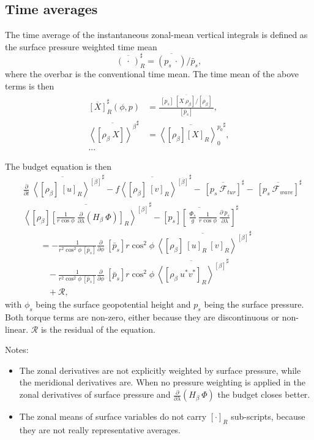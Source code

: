 \documentclass[11pt]{article}
\numberwithin{equation}{section}
\newcommand{\beq}{\begin{equation}}
\newcommand{\eeq}{\end{equation}}
\newcommand{\la}{\langle}
\newcommand{\ra}{\rangle}
\newcommand{\lara}[1]{\left\la{#1}\right\ra}
\newcommand{\cphi}{\cos \phi}
\newcommand{\rb}{\rho_\beta}
\newcommand{\barsharp}[1]{\overline{#1}^\sharp}
\begin{document}
\subsection{Time averages}
The time average of the instantaneous zonal-mean vertical integrals is defined as the surface pressure weighted time mean
\beq
\barsharp{(~\cdot~)}_R = \overline{(p_s ~ \cdot)} / \bar p_s, 
\eeq
%
%
where the overbar is the conventional time mean. The time mean of the above terms is then 
\begin{align}
\barsharp{[X]}_R(\phi, p) &=  \frac{ ~\overline{ [p_s]  ~ [X~ \rb ]/ [ \rb]}  ~ }{   [\bar p_s]  }, \nonumber  \\
\barsharp{  \lara{[\rb ~X]}^\beta  } &= \barsharp{ \lara{[\rb] [X]_R}_0^{p_0} },  \nonumber \\
\text{... } \nonumber
\end{align}

The budget equation is then 
\begin{align} \label{eq:balance_rb_tm}
&\barsharp{  \frac{\partial} {\partial t} ~\lara{[\rb]~[u]_R}^{[\beta]}   }  - \barsharp{ f \lara{ [\rb]~[v]_R} ^{[\beta]}}  -  ~ \barsharp{ [p_s ~ \mathcal{F}_{tur}] }  -  ~ \barsharp{ [p_s ~ \mathcal{F}_{wave}] }   \nonumber \\
&\barsharp{ \lara{  [\rb]   \left[ \frac{1}{r \cphi} ~ \frac{\partial}{\partial \lambda} \left( H_\beta  ~\Phi  \right)   \right]_R}^{[\beta]} } - \barsharp{[p_s]  \left[~\frac{\Phi_s}{g}~ \frac{1}{r \cphi} ~\frac{\partial~p_s}{\partial \lambda}\right]}  \nonumber\\ 
  &~~~~~~~~~= - \frac{1}{r^2 \cos^2{\phi} ~ [\bar p_s] }  \frac{\partial}{\partial \phi}  ~[\bar p_s]  r \cos^2{\phi} ~ \barsharp{ \lara{ [\rb]~[u]_R~[v]_R }^{[\beta]} }  \nonumber \\
  &~~~~~~~~~~~~~- \frac{1}{r^2 \cos^2{\phi} ~ [\bar p_s] }  \frac{\partial}{\partial \phi}  ~[\bar p_s]  r \cos^2{\phi} ~ \barsharp{ \lara{[\rb~ u^* v^{*}]_R   }^{[\beta]}  }  \nonumber\\
  &~~~~~~~~~~~~~+ \mathcal{R},
\end{align}
%
with $\phi_s$ being the surface geopotential height and $p_s$ being the surface pressure. Both torque terms are non-zero, either because they are discontinuous or non-linear. $\mathcal{R}$ is the residual of the equation.\par
Notes:

\begin{itemize}
\item The zonal derivatives are not explicitly weighted by surface pressure, while the meridional derivatives are.
When no pressure weighting is applied in the zonal derivatives of surface pressure and $\frac{\partial}{\partial \lambda} \left( H_\beta  ~\Phi\right)$ the budget closes better.
\item The zonal means of surface variables do not carry $[\cdot]_R$ sub-scripts, because they are not really representative averages.
\end{itemize}
\end{document}
